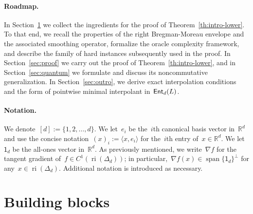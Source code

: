 \documentclass[11pt]{article}
\numberwithin{equation}{section}
\theoremstyle{remark}
\newcommand{\R}{\mathbb{R}}
\newcommand{\ones}{\mathsf{1}_d}
\newcommand{\ri}{\operatorname{ri}}
\newcommand{\Ent}{\textup{\textsf{Ent}}}
\newcommand{\Fh}{\Ent_d}
\newcommand{\Simp}{\Delta_d}
\newcommand{\spanof}[1]{\operatorname{span}\{#1\}}
\newcommand{\1}{\mathbf{1}}
\newcommand{\bnabla}{\nabla}
\begin{document}
\paragraph{Roadmap.}
In Section~\ref{sec:prelim} we collect the ingredients for the proof of Theorem~\ref{th:intro-lower}.
To that end, we recall the properties of the right Bregman-Moreau envelope and the associated smoothing operator, formalize the oracle complexity framework, and describe the family of hard instances subsequently used in the proof.
In Section~\ref{sec:proof} we carry out the proof of Theorem~\ref{th:intro-lower}, and in Section~\ref{sec:quantum} we formulate and discuss its noncommutative generalization. 
In Section~\ref{sec:outro}, we derive exact interpolation conditions and the form of pointwise minimal interpolant in~$\Fh(L)$.


\paragraph{Notation.}
We denote~$[d] := \{1,2,\dots, d\}$. We let~$e_i$ be the~$i$th canonical basis vector in~$\R^d$ and use the concise notation~$(x)_i := \langle x, e_i \rangle$ for the~$i$th entry of~$x \in \R^d$. We let~$\ones$ be the all-ones vector in~$\R^d$. As previously mentioned, we write~$\bnabla f$ for the {tangent} gradient of~$f \in C^1(\ri(\Simp))$; in particular,~$\bnabla f(x) \in \spanof{\ones}^\perp$ for any~$x \in \ri(\Simp)$. 
Additional notation is introduced as necessary.




\section{Building blocks}
\label{sec:prelim}
\end{document}
